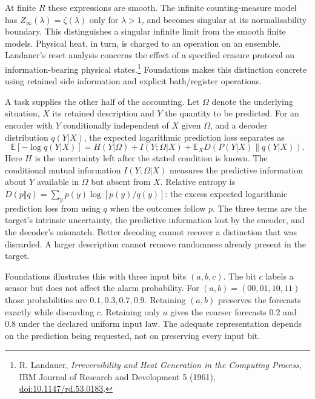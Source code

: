 At finite $R$ these expressions are smooth. The infinite counting-measure model has $Z_\infty(\lambda)=\zeta(\lambda)$ only for $\lambda>1$, and becomes singular at its normalisability boundary. This distinguishes a singular infinite limit from the smooth finite models. Physical heat, in turn, is charged to an operation on an ensemble. Landauer's reset analysis concerns the effect of a specified erasure protocol on information-bearing physical states.\footnote{R. Landauer, \emph{Irreversibility and Heat Generation in the Computing Process}, IBM Journal of Research and Development 5 (1961), \href{https://doi.org/10.1147/rd.53.0183}{doi:10.1147/rd.53.0183}.} Foundations makes this distinction concrete using retained side information and explicit bath/register operations.~\cite{Landauer1961f2ecf4}

A task supplies the other half of the accounting. Let $\Omega$ denote the underlying situation, $X$ its retained description and $Y$ the quantity to be predicted. For an encoder with $Y$ conditionally independent of $X$ given $\Omega$, and a decoder distribution $q(Y|X)$, the expected logarithmic prediction loss separates as
\begin{equation}
 \mathbb E[-\log q(Y|X)]
 =H(Y|\Omega)+I(Y;\Omega|X)
   +\mathbb E_X D\!\left(P(Y|X)\|q(Y|X)\right).
 \label{eq:predictive-loss}
\end{equation}
Here $H$ is the uncertainty left after the stated condition is known. The conditional mutual information $I(Y;\Omega|X)$ measures the predictive information about $Y$ available in $\Omega$ but absent from $X$. Relative entropy is $D(p\Vert q)=\sum_y p(y)\log[p(y)/q(y)]$: the excess expected logarithmic prediction loss from using $q$ when the outcomes follow $p$. The three terms are the target's intrinsic uncertainty, the predictive information lost by the encoder, and the decoder's mismatch. Better decoding cannot recover a distinction that was discarded. A larger description cannot remove randomness already present in the target.

Foundations illustrates this with three input bits $(a,b,c)$. The bit $c$ labels a sensor but does not affect the alarm probability. For $(a,b)=(00,01,10,11)$ those probabilities are $0.1,0.3,0.7,0.9$. Retaining $(a,b)$ preserves the forecasts exactly while discarding $c$. Retaining only $a$ gives the coarser forecasts $0.2$ and $0.8$ under the declared uniform input law. The adequate representation depends on the prediction being requested, not on preserving every input bit.

